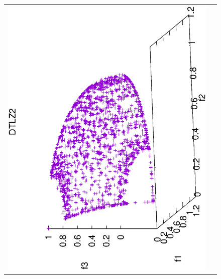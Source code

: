 \begin{figure}[H]
\begin{tabular}{cc}
  \includegraphics[scale=0.3, angle=-90,origin=c]{Figures_Chapter7/Results_Chapter4/Summary_Representative/VSD-MOEA/DTLZ2.eps} &

\end{tabular}
\end{figure}

